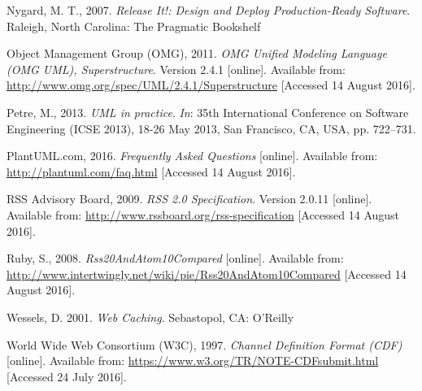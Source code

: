 \documentclass[a4paper]{article}
\begin{document}
\begin{thebibliography}{9}
Nygard, M. T., 2007.
\textit{Release It!: Design and Deploy Production-Ready Software}.
Raleigh, North Carolina: The Pragmatic Bookshelf

Object Management Group (OMG), 2011.
\textit{OMG Unified Modeling Language (OMG UML), Superstructure}. Version 2.4.1 [online].
Available from: \url{http://www.omg.org/spec/UML/2.4.1/Superstructure} [Accessed 14 August 2016].

Petre, M., 2013.
\textit{UML in practice}. \textit{In}: 35th International Conference on Software Engineering (ICSE 2013), 18-26 May 2013, San Francisco, CA, USA, pp. 722–731.

PlantUML.com, 2016.
\textit{Frequently Asked Questions} [online].
Available from: \url{http://plantuml.com/faq.html} [Accessed 14 August 2016].

RSS Advisory Board, 2009.
\textit{RSS 2.0 Specification}. Version 2.0.11 [online].
Available from: \url{http://www.rssboard.org/rss-specification} [Accessed 14 August 2016].

Ruby, S., 2008.
\textit{Rss20AndAtom10Compared} [online].
Available from: \url{http://www.intertwingly.net/wiki/pie/Rss20AndAtom10Compared} [Accessed 14 August 2016].

Wessels, D. 2001.
\textit{Web Caching}.
Sebastopol, CA: O'Reilly

World Wide Web Consortium (W3C), 1997.
\textit{Channel Definition Format (CDF)} [online].
Available from: \url{https://www.w3.org/TR/NOTE-CDFsubmit.html}
[Accessed 24 July 2016].

\end{thebibliography}
\end{document}
